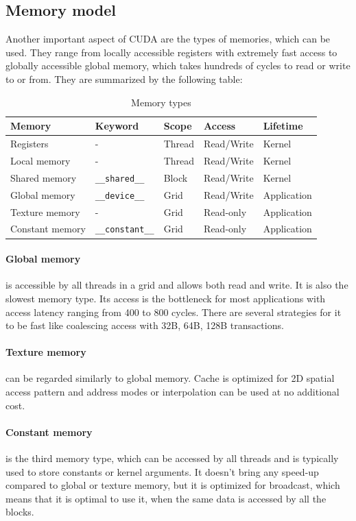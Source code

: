 \FloatBarrier
\subsection{Memory model}\label{subsec:memory}

Another important aspect of CUDA are the types of memories, which can be used. They range from locally accessible registers with extremely fast access to globally accessible global memory, which takes hundreds of cycles to read or write to or from. They are summarized by the following table:

\begin{table}
\centering
\begin{tabular}{| l | l | l | l | l |}
\hline
Memory & Keyword & Scope & Access & Lifetime \\
\hline
Registers & - & Thread & Read/Write & Kernel \\
\hline
Local memory & - & Thread & Read/Write & Kernel \\
\hline
Shared memory & \verb|__shared__| & Block & Read/Write &  Kernel \\
\hline
Global memory & \verb|__device__| & Grid & Read/Write & Application \\
\hline
Texture memory & - & Grid & Read-only & Application \\
\hline
Constant memory & \verb|__constant__| & Grid & Read-only & Application \\
\hline
\end{tabular}
\caption{Memory types}
\end{table}

\paragraph{Global memory} is accessible by all threads in a grid and allows both read and write. It is also the slowest memory type. Its access is the bottleneck for most applications with access latency ranging from 400 to 800 cycles. There are several strategies for it to be fast like coalescing access with 32B, 64B, 128B transactions.

\paragraph{Texture memory} can be regarded similarly to global memory. Cache is optimized for 2D spatial access pattern and address modes or interpolation can be used at no additional cost.

\paragraph{Constant memory} is the third memory type, which can be accessed by all threads and is typically used to store constants or kernel arguments. It doesn't bring any speed-up compared to global or texture memory, but it is optimized for broadcast, which means that it is optimal to use it, when the same data is accessed by all the blocks.

